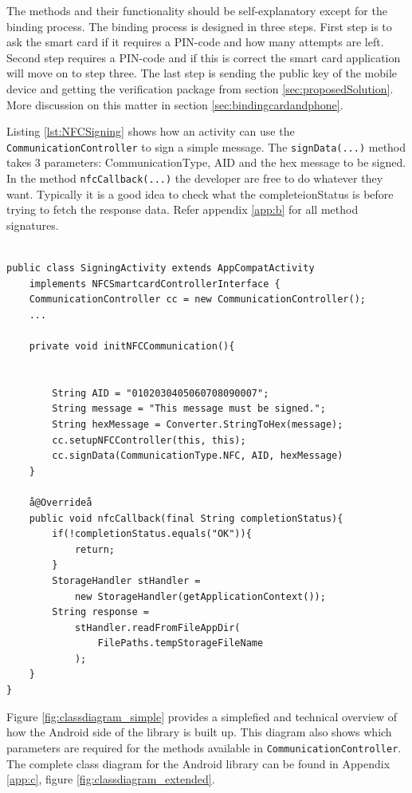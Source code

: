 The methods and their functionality should be self-explanatory except for the binding process. The binding process is designed in three steps. First step is to ask the smart card if it requires a PIN-code and how many attempts are left. Second step requires a PIN-code and if this is correct the smart card application will move on to step three. The last step is sending the public key of the mobile device and getting the verification package from section \ref{sec:proposedSolution}. More discussion on this matter in section \ref{sec:bindingcardandphone}.

Listing \ref{lst:NFCSigning} shows how an activity can use the \texttt{CommunicationController} to sign a simple message. The \texttt{signData(...)} method takes 3 parameters: CommunicationType, AID and the hex message to be signed. In the method \texttt{nfcCallback(...)} the developer are free to do whatever they want. Typically it is a good idea to check what the completeionStatus is before trying to fetch the response data. Refer appendix \ref{app:b} for all method signatures. 

\begin{lstlisting}[caption=Java code example showing how to send sign a message using a NFC smart card., label=lst:NFCSigning,escapechar=å]

public class SigningActivity extends AppCompatActivity
    implements NFCSmartcardControllerInterface {
    CommunicationController cc = new CommunicationController();
    ...

    private void initNFCCommunication(){


        String AID = "0102030405060708090007";
        String message = "This message must be signed.";
        String hexMessage = Converter.StringToHex(message);
        cc.setupNFCController(this, this);
        cc.signData(CommunicationType.NFC, AID, hexMessage)
    }

    å@Overrideå
    public void nfcCallback(final String completionStatus){
        if(!completionStatus.equals("OK")){
            return;
        }
        StorageHandler stHandler =
            new StorageHandler(getApplicationContext());
        String response =
            stHandler.readFromFileAppDir(
                FilePaths.tempStorageFileName
            );
    }
}

\end{lstlisting}


Figure \ref{fig:classdiagram_simple} provides a simplefied and technical overview of how the Android side of the library is built up. This diagram also shows which parameters are required for the methods available in \texttt{CommunicationController}. The complete class diagram for the Android library can be found in Appendix \ref{app:c}, figure \ref{fig:classdiagram_extended}.

